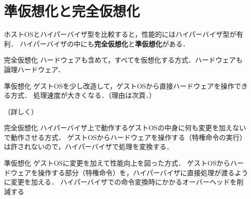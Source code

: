 \section{準仮想化と完全仮想化}\hypertarget{sec:準仮想化と完全仮想化}{}
\tocc
\begin{frame}[t]{\fftitle}
    ホストOSとハイパーバイザ型を比較すると，性能的にはハイパーバイザ型が有利．
    ハイパーバイザの中にも\textbf{完全仮想化}と\textbf{準仮想化}がある．
    \begin{block}{完全仮想化}
        ハードウェアも含めて，すべてを仮想化する方式．ハードウェアも論理ハードウェア．
    \end{block}
    \begin{block}{準仮想化}
        ゲストOSを少し改造して，ゲストOSから直接ハードウェアを操作できる方式．
        処理速度が大きくなる．（理由は次頁．）
    \end{block}
    \hfill\hyperlink{sec:クラウドコンピューティング}{}
\end{frame}
\begin{frame}[t]{\fftitle （詳しく）}
    \begin{block}{完全仮想化}
        ハイパーバイザ上で動作するゲストOSの中身に何も変更を加えないで動作させる方式．
        ゲストOSからハードウェアを操作する（特権命令の実行）は許されないので，ハイパーバイザで処理を変換する．
    \end{block}
    \begin{block}{準仮想化}
        ゲストOSに変更を加えて性能向上を図った方式．
        ゲストOSからハードウェアを操作する部分（特権命令）を，ハイパーバイザに直接処理が渡るように変更を加える．
        ハイパーバイザでの命令変換時にかかるオーバーヘッドを削減する
    \end{block}
    \hfill\cite{仮想化技術}
\end{frame}
